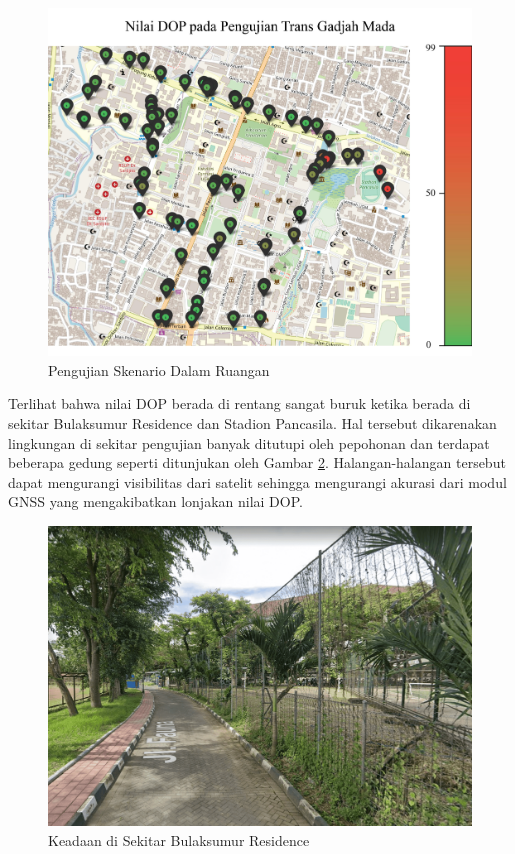 \begin{figure}[H]
	\centering
	\includegraphics[width=12cm]{contents/chapter-4/pengujian-bergerak/moving-dop.jpg}
	\caption{Pengujian Skenario Dalam Ruangan}
	\label{Fig: moving-dop}
\end{figure}

Terlihat bahwa nilai DOP berada di rentang sangat buruk ketika berada di sekitar Bulaksumur Residence dan Stadion Pancasila. Hal tersebut dikarenakan lingkungan di sekitar pengujian banyak ditutupi oleh pepohonan dan terdapat beberapa gedung seperti ditunjukan oleh Gambar \ref{Fig: lp-streetview}. Halangan-halangan tersebut dapat mengurangi visibilitas dari satelit sehingga mengurangi akurasi dari modul GNSS yang mengakibatkan lonjakan nilai DOP.

\begin{figure}[H]
	\centering
	\includegraphics[width=14cm]{contents/chapter-4/pengujian-bergerak/lp-streetview.png}
	\caption{Keadaan di Sekitar Bulaksumur Residence}
	\label{Fig: lp-streetview}
\end{figure}

